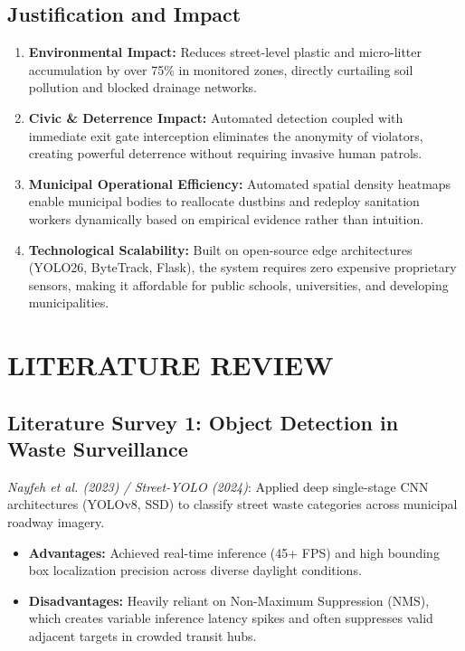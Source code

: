 \documentclass[12pt,a4paper]{report}
\begin{document}
\section{Justification and Impact}
\begin{enumerate}
\item \textbf{Environmental Impact:} Reduces street-level plastic and micro-litter accumulation by over 75\% in monitored zones, directly curtailing soil pollution and blocked drainage networks.
\item \textbf{Civic \& Deterrence Impact:} Automated detection coupled with immediate exit gate interception eliminates the anonymity of violators, creating powerful deterrence without requiring invasive human patrols.
\item \textbf{Municipal Operational Efficiency:} Automated spatial density heatmaps enable municipal bodies to reallocate dustbins and redeploy sanitation workers dynamically based on empirical evidence rather than intuition.
\item \textbf{Technological Scalability:} Built on open-source edge architectures (YOLO26, ByteTrack, Flask), the system requires zero expensive proprietary sensors, making it affordable for public schools, universities, and developing municipalities.
\end{enumerate}

\newpage
\chapter{LITERATURE REVIEW}

\section{Literature Survey 1: Object Detection in Waste Surveillance}
\textit{Nayfeh et al. (2023) / Street-YOLO (2024)}: Applied deep single-stage CNN architectures (YOLOv8, SSD) to classify street waste categories across municipal roadway imagery.
\begin{itemize}
\item \textbf{Advantages:} Achieved real-time inference (45+ FPS) and high bounding box localization precision across diverse daylight conditions.
\item \textbf{Disadvantages:} Heavily reliant on Non-Maximum Suppression (NMS), which creates variable inference latency spikes and often suppresses valid adjacent targets in crowded transit hubs.
\end{itemize}
\end{document}
